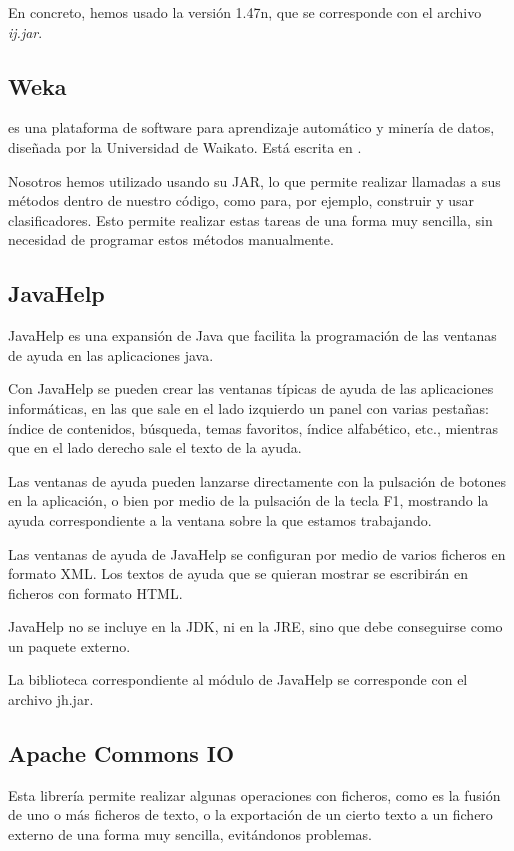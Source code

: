 En concreto, hemos usado la versión 1.47n, que se corresponde con el archivo \textit{ij.jar}.

\subsection{Weka}
\weka{}\cite{weka} es una plataforma de software para aprendizaje automático y minería de datos, diseñada por la Universidad de Waikato. Está escrita en \java{}.

Nosotros hemos utilizado \weka{} usando su JAR, lo que permite realizar llamadas a sus métodos dentro de nuestro código, como para, por ejemplo, construir y usar clasificadores. Esto permite realizar estas tareas de una forma muy sencilla, sin necesidad de programar estos métodos manualmente.

\subsection{JavaHelp}
JavaHelp es una expansión de Java que facilita la programación de las ventanas de ayuda en las aplicaciones java.

Con JavaHelp se pueden crear las ventanas típicas de ayuda de las aplicaciones informáticas, en las que sale en el lado izquierdo un panel con varias pestañas: índice de contenidos, búsqueda, temas favoritos, índice alfabético, etc., mientras que en el lado derecho sale el texto de la ayuda.

Las ventanas de ayuda pueden lanzarse directamente con la pulsación de botones en la aplicación, o bien por medio de la pulsación de la tecla F1, mostrando la ayuda correspondiente a la ventana sobre la que estamos trabajando.

Las ventanas de ayuda de JavaHelp se configuran por medio de varios ficheros en formato XML. Los textos de ayuda que se quieran mostrar se escribirán en ficheros con formato HTML.

JavaHelp no se incluye en la JDK, ni en la JRE, sino que debe conseguirse como un paquete externo.

La biblioteca correspondiente al módulo de JavaHelp se corresponde con el archivo jh.jar.


\subsection{Apache Commons IO}
Esta librería permite realizar algunas operaciones con ficheros, como es la fusión de uno o más ficheros de texto, o la exportación de un cierto texto a un fichero externo de una forma muy sencilla, evitándonos problemas.

